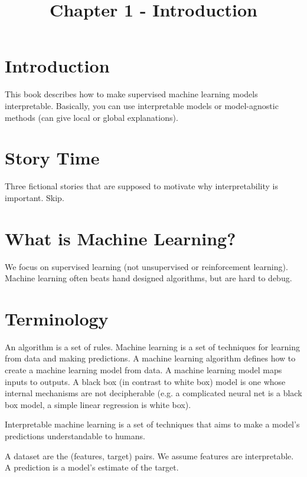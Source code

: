 \documentclass[a4paper]{article}
\title{Chapter 1 - Introduction}
\date{}
\begin{document}
\maketitle

\section{Introduction}
This book describes how to make supervised machine learning models
interpretable. Basically, you can use interpretable models or model-agnostic
methods (can give local or global explanations).

\section{Story Time}
Three fictional stories that are supposed to motivate why interpretability is
important. Skip.

\section{What is Machine Learning?}
We focus on supervised learning (not unsupervised or reinforcement learning).
Machine learning often beats hand designed algorithms, but are hard to debug.

\section{Terminology}
An algorithm is a set of rules. Machine learning is a set of techniques for
learning from data and making predictions. A machine learning algorithm
defines how to create a machine learning model from data. A machine learning
model maps inputs to outputs. A black box (in contrast to white box) model is
one whose internal mechanisms are not decipherable (e.g. a complicated
neural net is a black box model, a simple linear regression is white box).

Interpretable machine learning is a set of techniques that aims to make a
model's predictions understandable to humans.

A dataset are the (features, target) pairs. We assume features are
interpretable. A prediction is a model's estimate of the target.
\end{document}
